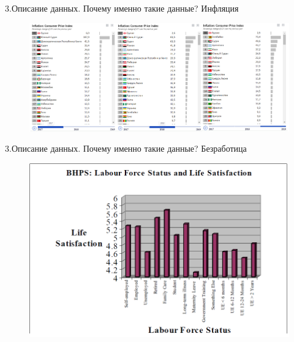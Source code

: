 \documentclass[aspectratio=169]{beamer}
\begin{document}
\begin{frame}{3.Описание данных. Почему именно такие данные? Инфляция}

\begin{figure} \label{hompic}
            \centering
            \includegraphics[scale=0.4]{Inflation.png}
    \end{figure}
    
\end{frame}

\begin{frame}{3.Описание данных. Почему именно такие данные? Безработица}

\begin{figure} \label{hompic}
            \centering
            \includegraphics[scale=0.6]{2023-05-02 (5).png}
    \end{figure}
    
\end{frame}
\end{document}
